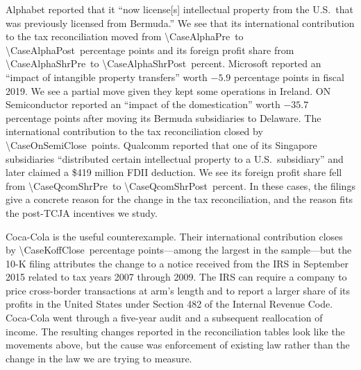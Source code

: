 \documentclass[11pt,letterpaper]{article}
\newcommand{\ShareNum}[1]{\num[round-mode=places,round-precision=1]{#1}}
\begin{document}
Alphabet reported
that it ``now license[s] intellectual property from the U.S.~that was previously
licensed from Bermuda.'' We see that its international contribution to
the tax reconciliation moved from
\ShareNum{\CaseAlphaPre}\ to \ShareNum{\CaseAlphaPost}\ percentage points and
its foreign profit share from \ShareNum{\CaseAlphaShrPre}\ to
\ShareNum{\CaseAlphaShrPost}\ percent. 
Microsoft reported an ``impact of
intangible property transfers'' worth $-5.9$ percentage points in fiscal 2019.
We see a partial move given they kept some operations in Ireland.
ON Semiconductor reported an ``impact of the domestication'' worth $-35.7$
percentage points after moving its Bermuda subsidiaries to Delaware. The
international contribution to the tax reconciliation closed by \ShareNum{\CaseOnSemiClose}\ points.
Qualcomm reported that one of its Singapore subsidiaries ``distributed certain
intellectual property to a U.S.~subsidiary'' and later claimed a \$419 million
FDII deduction. We see its foreign profit share fell from
\ShareNum{\CaseQcomShrPre}\ to \ShareNum{\CaseQcomShrPost}\ percent.
In these cases, the filings give a concrete reason for the change in the tax
reconciliation, and the reason fits the post-TCJA incentives we study.


Coca-Cola is the useful counterexample. Their international contribution
closes by \ShareNum{\CaseKoffClose}\ percentage points---among the
largest in the sample---but the 10-K filing attributes the change to a notice
received from the IRS in September 2015 related to tax years 2007 through
2009.  The IRS can require a
company to price cross-border transactions at arm's length and to
report a larger share of its profits in the United States under Section 482
of the Internal Revenue Code. 
Coca-Cola went through a five-year audit and a subsequent reallocation of
income.  The resulting
changes reported in the reconciliation tables look like the movements above, but the
cause was enforcement of existing law rather than the change in the law we
are trying to measure.
\end{document}
